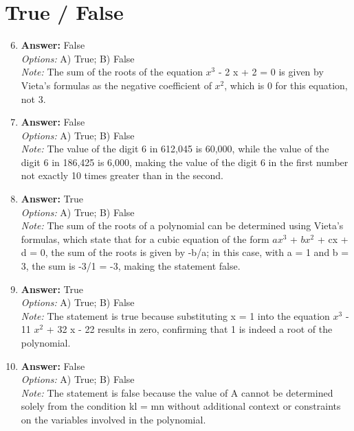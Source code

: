 \documentclass[12pt]{article}
\begin{document}
\section*{True / False}
\begin{enumerate}[label=\arabic*.]
\setcounter{enumi}{5}
\item \textbf{Answer:} False
\\ \textit{Options:} A) True; B) False
\\ \textit{Note:} The sum of the roots of the equation $x^3$ - 2 x + 2 = 0 is given by Vieta's formulas as the negative coefficient of $x^2$, which is 0 for this equation, not 3.
\item \textbf{Answer:} False
\\ \textit{Options:} A) True; B) False
\\ \textit{Note:} The value of the digit 6 in 612,045 is 60,000, while the value of the digit 6 in 186,425 is 6,000, making the value of the digit 6 in the first number not exactly 10 times greater than in the second.
\item \textbf{Answer:} True
\\ \textit{Options:} A) True; B) False
\\ \textit{Note:} The sum of the roots of a polynomial can be determined using Vieta's formulas, which state that for a cubic equation of the form $ax^3$ + $bx^2$ + cx + d = 0, the sum of the roots is given by -b/a; in this case, with a = 1 and b = 3, the sum is -3/1 = -3, making the statement false.
\item \textbf{Answer:} True
\\ \textit{Options:} A) True; B) False
\\ \textit{Note:} The statement is true because substituting x = 1 into the equation $x^3$ - 11 $x^2$ + 32 x - 22 results in zero, confirming that 1 is indeed a root of the polynomial.
\item \textbf{Answer:} False
\\ \textit{Options:} A) True; B) False
\\ \textit{Note:} The statement is false because the value of A cannot be determined solely from the condition kl = mn without additional context or constraints on the variables involved in the polynomial.
\end{enumerate}
\end{document}
